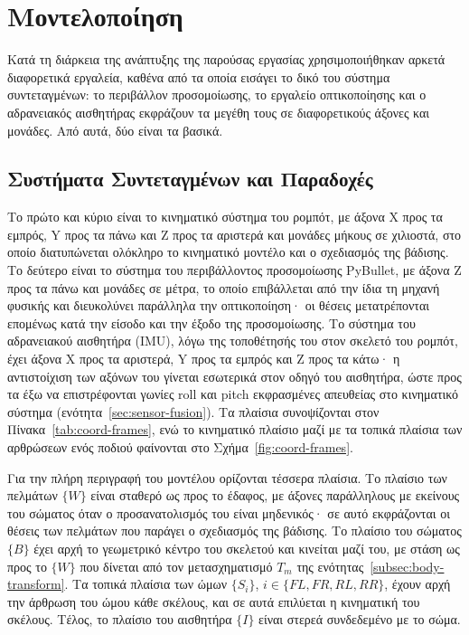 \documentclass[11pt]{report}
\begin{document}
\chapter{Μοντελοποίηση}
\label{ch:modeling}
Κατά τη διάρκεια της ανάπτυξης της παρούσας εργασίας χρησιμοποιήθηκαν αρκετά
διαφορετικά εργαλεία, καθένα από τα οποία εισάγει το δικό του σύστημα
συντεταγμένων: το περιβάλλον προσομοίωσης, το εργαλείο οπτικοποίησης και ο
αδρανειακός αισθητήρας εκφράζουν τα μεγέθη τους σε διαφορετικούς άξονες και
μονάδες. Από αυτά, δύο είναι τα βασικά. 

\section{Συστήματα Συντεταγμένων και Παραδοχές}
\label{sec:coord-frames}
Το πρώτο και κύριο είναι το κινηματικό σύστημα του
ρομπότ, με άξονα X προς τα εμπρός, Y προς τα πάνω και Z προς τα αριστερά και
μονάδες μήκους σε χιλιοστά, στο οποίο διατυπώνεται ολόκληρο το κινηματικό
μοντέλο και ο σχεδιασμός της βάδισης. Το δεύτερο είναι το σύστημα του
περιβάλλοντος προσομοίωσης PyBullet, με άξονα Z προς τα πάνω και μονάδες σε
μέτρα, το οποίο επιβάλλεται από την ίδια τη μηχανή φυσικής και διευκολύνει
παράλληλα την οπτικοποίηση· οι θέσεις μετατρέπονται επομένως κατά την είσοδο και
την έξοδο της προσομοίωσης. Το σύστημα του αδρανειακού αισθητήρα (IMU), λόγω της
τοποθέτησής του στον σκελετό του ρομπότ, έχει άξονα X προς τα αριστερά, Y προς
τα εμπρός και Z προς τα κάτω· η αντιστοίχιση των αξόνων του γίνεται εσωτερικά στον
οδηγό του αισθητήρα, ώστε προς τα έξω να επιστρέφονται γωνίες roll και pitch
εκφρασμένες απευθείας στο κινηματικό σύστημα (ενότητα~\ref{sec:sensor-fusion}).
Τα πλαίσια συνοψίζονται στον
Πίνακα~\ref{tab:coord-frames}, ενώ το κινηματικό πλαίσιο μαζί με τα τοπικά
πλαίσια των αρθρώσεων ενός ποδιού φαίνονται στο
Σχήμα~\ref{fig:coord-frames}.

Για την πλήρη περιγραφή του μοντέλου ορίζονται τέσσερα πλαίσια. Το πλαίσιο των
πελμάτων $\{W\}$ είναι σταθερό ως προς το έδαφος, με άξονες παράλληλους με
εκείνους του σώματος όταν ο προσανατολισμός του είναι μηδενικός· σε αυτό
εκφράζονται οι θέσεις των πελμάτων που παράγει ο σχεδιασμός της βάδισης. Το
πλαίσιο του σώματος $\{B\}$ έχει αρχή το γεωμετρικό κέντρο του σκελετού και
κινείται μαζί του, με στάση ως προς το $\{W\}$ που δίνεται από τον
μετασχηματισμό $T_m$ της ενότητας~\ref{subsec:body-transform}. Τα τοπικά
πλαίσια των ώμων $\{S_i\}$, $i \in \{FL, FR, RL, RR\}$, έχουν αρχή την άρθρωση
του ώμου κάθε σκέλους, και σε αυτά επιλύεται η κινηματική του σκέλους. Τέλος,
το πλαίσιο του αισθητήρα $\{I\}$ είναι στερεά συνδεδεμένο με το σώμα.
\end{document}
